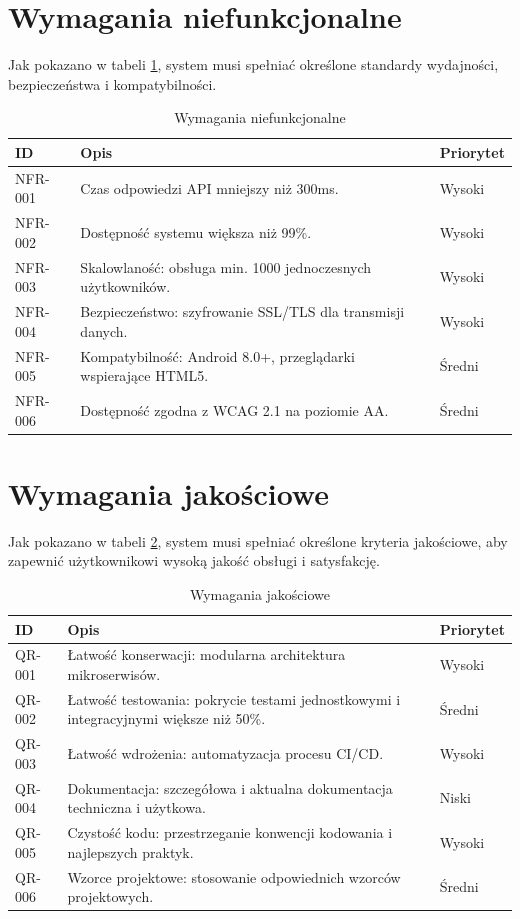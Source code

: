 \section{Wymagania niefunkcjonalne}
Jak pokazano w tabeli \ref{tab:niefunkcjonalne}, system musi spełniać określone standardy wydajności, bezpieczeństwa i kompatybilności.
\begin{table}[ht!]
\centering
\caption{Wymagania niefunkcjonalne}
\label{tab:niefunkcjonalne}
\begin{tabular}{lll}
\toprule
ID & Opis & Priorytet \\  
\midrule
NFR-001      & Czas odpowiedzi API mniejszy niż 300ms.    & Wysoki \\
NFR-002      & Dostępność systemu większa niż 99\%.        & Wysoki \\ 
NFR-003      & Skalowlaność: obsługa min. 1000 jednoczesnych użytkowników.    & Wysoki \\
NFR-004      & Bezpieczeństwo: szyfrowanie SSL/TLS dla transmisji danych.    & Wysoki \\
NFR-005      & Kompatybilność: Android 8.0+, przeglądarki wspierające HTML5.	    & Średni \\
NFR-006      & Dostępność zgodna z WCAG 2.1 na poziomie AA.    & Średni \\
\bottomrule 
\end{tabular}
\end{table}

\section{Wymagania jakościowe}
Jak pokazano w tabeli \ref{tab:jeśli_quality}, system musi spełniać określone kryteria jakościowe, aby zapewnić użytkownikowi wysoką jakość obsługi i satysfakcję.
\begin{table}[ht!]
\centering
\caption{Wymagania jakościowe}
\label{tab:jeśli_quality}
\begin{tabular}{lll}
\toprule
ID & Opis & Priorytet \\  
\midrule
QR-001      & Łatwość konserwacji: modularna architektura mikroserwisów.    & Wysoki \\
QR-002      & Łatwość testowania: pokrycie testami jednostkowymi i integracyjnymi większe niż 50\%.    & Średni \\ 
QR-003      & Łatwość wdrożenia: automatyzacja procesu CI/CD.    & Wysoki \\
QR-004      & Dokumentacja: szczegółowa i aktualna dokumentacja techniczna i użytkowa.    & Niski \\
QR-005      & Czystość kodu: przestrzeganie konwencji kodowania i najlepszych praktyk.    & Wysoki \\
QR-006      & Wzorce projektowe: stosowanie odpowiednich wzorców projektowych.	    & Średni \\
\bottomrule 
\end{tabular}
\end{table}

